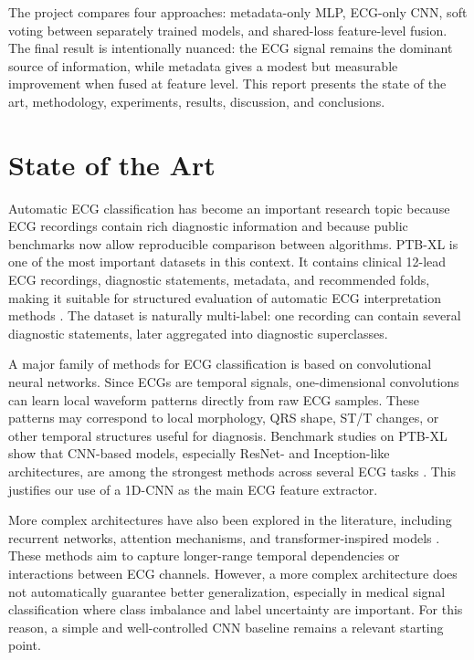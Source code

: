 \documentclass[11pt,a4paper]{article}
\begin{document}
The project compares four approaches: metadata-only MLP, ECG-only CNN, soft voting between separately trained models, and shared-loss feature-level fusion. The final result is intentionally nuanced: the ECG signal remains the dominant source of information, while metadata gives a modest but measurable improvement when fused at feature level. This report presents the state of the art, methodology, experiments, results, discussion, and conclusions.

\section{State of the Art}

Automatic ECG classification has become an important research topic because ECG recordings contain rich diagnostic information and because public benchmarks now allow reproducible comparison between algorithms. PTB-XL is one of the most important datasets in this context. It contains clinical 12-lead ECG recordings, diagnostic statements, metadata, and recommended folds, making it suitable for structured evaluation of automatic ECG interpretation methods \cite{wagner2020ptbxl,physionetptbxl}. The dataset is naturally multi-label: one recording can contain several diagnostic statements, later aggregated into diagnostic superclasses.

A major family of methods for ECG classification is based on convolutional neural networks. Since ECGs are temporal signals, one-dimensional convolutions can learn local waveform patterns directly from raw ECG samples. These patterns may correspond to local morphology, QRS shape, ST/T changes, or other temporal structures useful for diagnosis. Benchmark studies on PTB-XL show that CNN-based models, especially ResNet- and Inception-like architectures, are among the strongest methods across several ECG tasks \cite{strodthoff2021deep,strodthoffrepo}. This justifies our use of a 1D-CNN as the main ECG feature extractor.

More complex architectures have also been explored in the literature, including recurrent networks, attention mechanisms, and transformer-inspired models \cite{jafari2026temporal}. These methods aim to capture longer-range temporal dependencies or interactions between ECG channels. However, a more complex architecture does not automatically guarantee better generalization, especially in medical signal classification where class imbalance and label uncertainty are important. For this reason, a simple and well-controlled CNN baseline remains a relevant starting point.
\end{document}
